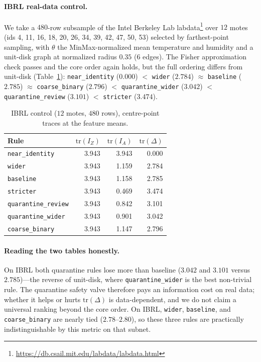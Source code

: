 \documentclass[11pt,a4paper]{article}
\begin{document}
\paragraph{IBRL real-data control.}
We take a $480$-row subsample of the Intel Berkeley Lab
labdata\footnote{\url{https://db.csail.mit.edu/labdata/labdata.html}} over
$12$ motes (ids 4, 11, 16, 18, 20, 26, 34, 39, 42, 47, 50, 53) selected by farthest-point sampling, with
$\theta$ the MinMax-normalized mean temperature and humidity and a unit-disk
graph at normalized radius $0.35$ ($6$ edges). The Fisher approximation check
passes and the core order again holds, but the full ordering differs from
unit-disk (Table~\ref{tab:ibrl}):
\texttt{near\_identity} ($0.000$) $<$ \texttt{wider} ($2.784$) $\approx$
\texttt{baseline} ($2.785$) $\approx$ \texttt{coarse\_binary} ($2.796$) $<$
\texttt{quarantine\_wider} ($3.042$) $<$ \texttt{quarantine\_review} ($3.101$)
$<$ \texttt{stricter} ($3.474$).

\begin{table}[t]
\centering
\caption{IBRL control ($12$ motes, $480$ rows), centre-point traces at the feature means.}
\label{tab:ibrl}
\begin{tabular}{lrrr}
\toprule
Rule & $\mathrm{tr}(I_Z)$ & $\mathrm{tr}(I_A)$ & $\mathrm{tr}(\Delta)$ \\
\midrule
\texttt{near\_identity} & 3.943 & 3.943 & 0.000 \\
\texttt{wider} & 3.943 & 1.159 & 2.784 \\
\texttt{baseline} & 3.943 & 1.158 & 2.785 \\
\texttt{stricter} & 3.943 & 0.469 & 3.474 \\
\texttt{quarantine\_review} & 3.943 & 0.842 & 3.101 \\
\texttt{quarantine\_wider} & 3.943 & 0.901 & 3.042 \\
\texttt{coarse\_binary} & 3.943 & 1.147 & 2.796 \\
\bottomrule
\end{tabular}
\end{table}

\paragraph{Reading the two tables honestly.}
On IBRL both quarantine rules lose more than baseline ($3.042$ and $3.101$
versus $2.785$)---the reverse of unit-disk, where \texttt{quarantine\_wider}
is the best non-trivial rule. The quarantine safety valve therefore pays an
information cost on real data; whether it helps or hurts $\mathrm{tr}(\Delta)$
is data-dependent, and we do not claim a universal ranking beyond the core
order. On IBRL, \texttt{wider}, \texttt{baseline}, and
\texttt{coarse\_binary} are nearly tied ($2.78$--$2.80$), so these three rules
are practically indistinguishable by this metric on that subnet.
\end{document}
